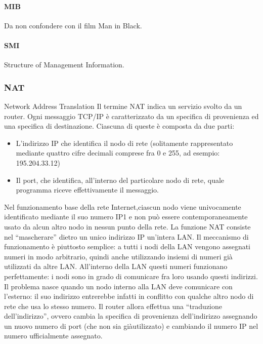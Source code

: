 \documentclass[a4paper,11pt]{article}
\def\subsub#1{\subsubsection{#1}\label{#1}}
\def\para#1{\paragraph{#1}\label{#1}}
\begin{document}
\para{MIB} Da non confondere con il film Man in Black.
\para{SMI} Structure of Management Information.
\subsub{NAT}
Network Address Translation
Il termine NAT indica un servizio svolto da un router.
 Ogni messaggio TCP/IP è caratterizzato da un specifica di provenienza ed una specifica di destinazione.
 Ciascuna di queste è composta da due parti:
 \begin{itemize}
 	\item L’indirizzo IP che identifica il nodo di rete (solitamente rappresentato mediante quattro cifre decimali comprese fra 0 e 255, ad esempio:
 	195.204.33.12) 
 	\item Il port, che identifica, all’interno del particolare nodo di rete, quale programma riceve effettivamente il messaggio.
 \end{itemize}
 
 Nel funzionamento base della rete Internet,ciascun nodo viene univocamente identificato mediante il suo numero IP1 e non può essere contemporaneamente usato da alcun altro nodo in nessun punto della rete.
 La funzione NAT consiste nel “mascherare” dietro un unico indirizzo IP un’intera LAN.
 Il meccanismo di funzionamento è
 piuttosto semplice: a tutti i nodi della LAN vengono assegnati numeri in modo arbitrario, quindi anche utilizzando insiemi di numeri già utilizzati da altre
 LAN. All’interno della LAN questi numeri funzionano
 perfettamente: i nodi sono in grado di comunicare fra loro usando questi indirizzi.
 Il problema nasce quando un nodo interno alla LAN deve
 comunicare con l’esterno: il suo indirizzo entrerebbe infatti in conflitto con qualche altro nodo di rete che usa lo stesso numero. Il router allora effettua
 una “traduzione dell’indirizzo”, ovvero cambia la specifica di provenienza dell’indirizzo assegnando un nuovo numero di port (che non sia giàutilizzato) e cambiando il numero IP nel numero ufficialmente assegnato.
 
\end{document}
